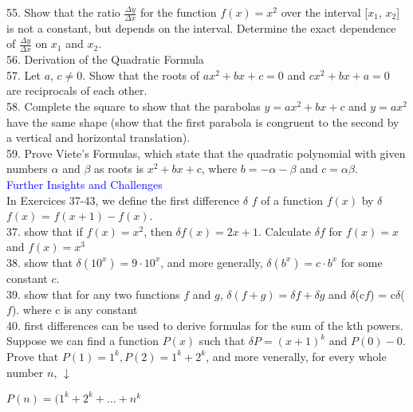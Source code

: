 \documentclass{article}
\begin{document}
55. Show that the ratio $\frac{\Delta y}{\Delta x}$ for the function $f(x) = x^2$ over the interval [$x_1$, $x_2$] is not a constant, but depends on the interval. Determine the exact dependence of $\frac{\Delta y}{\Delta x}$ on $x_1$ and $x_2$.\\

56.  Derivation of the Quadratic Formula\\

57. Let $a$, $c \neq 0$. Show that the roots of $ax^2 + bx + c = 0$ and $cx^2 + bx + a = 0$ are reciprocals of each other.\\

58. Complete the square to show that the parabolas $y = ax^2 + bx + c$ and $y = ax^2$ have the same shape (show that the first parabola is congruent to the second by a vertical and horizontal translation).\\

59. Prove Viete's Formulas, which state that the quadratic polynomial with given numbers $\alpha$ and $\beta$ as roots is $x^2 + bx + c$, where $b = -\alpha - \beta$ and $c = \alpha\beta$.\\


\textcolor{blue}{Further Insights and Challenges} \\
In Exercices 37-43, we define the first difference $\delta$ $f$ of a function $f(x)$ by $\delta$ $f(x)$ = $f(x+1) -  f(x).$\\

37. show that if $f(x) = x^2$, then $\delta f(x) = 2x + 1$. Calculate $\delta f$ for $f(x) = x$ and $f(x) = x^3$ \\

38. show that $\delta(10^x) = 9 \cdot 10^x$, and more generally, $\delta(b^x) = c \cdot b^x$ for some constant $c$.\\

39. show that for any two functions $f$ and $g$, $\delta(f + g) = \delta f + \delta g$ and $\delta$(c$f$) = c$\delta$($f$). where c is any constant\\

40. first differences can be used to derive formulas for the sum of the kth powers. Suppose we can find a function $P(x)$ such that $\delta P = (x + 1)^k$ and $P(0) - 0$. Prove that $P(1) = 1^k, P(2) = 1^k + 2^k$, and more venerally, for every whole number $n$, $\downarrow$

	\begin{center}$P(n) = (1^k + 2^k + \dots + n^k$\end{center}
\end{document}

